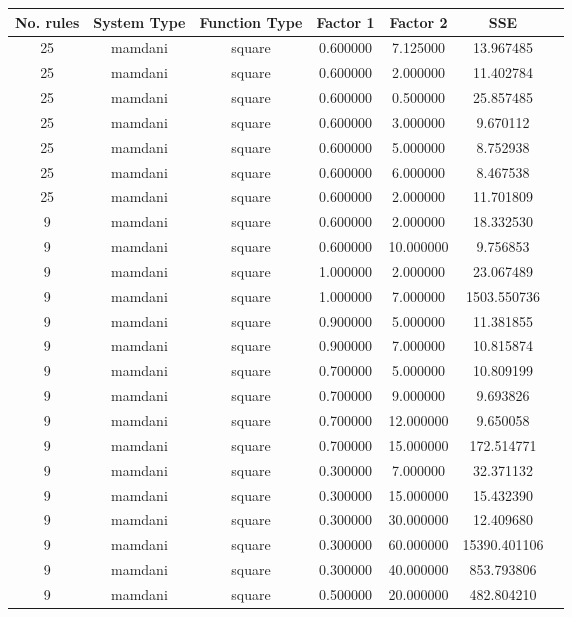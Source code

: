 \begin{tabular}{|c|c|c|c|c|c|c|}
\hline
No. rules & System Type & Function Type & Factor 1 & Factor 2 & SSE \\
\hline
25 & mamdani & square & 0.600000 & 7.125000 & 13.967485\\
\hline
25 & mamdani & square & 0.600000 & 2.000000 & 11.402784\\
\hline
25 & mamdani & square & 0.600000 & 0.500000 & 25.857485\\
\hline
25 & mamdani & square & 0.600000 & 3.000000 & 9.670112\\
\hline
25 & mamdani & square & 0.600000 & 5.000000 & 8.752938\\
\hline
25 & mamdani & square & 0.600000 & 6.000000 & 8.467538\\
\hline
25 & mamdani & square & 0.600000 & 2.000000 & 11.701809\\
\hline
9 & mamdani & square & 0.600000 & 2.000000 & 18.332530\\
\hline
9 & mamdani & square & 0.600000 & 10.000000 & 9.756853\\
\hline
9 & mamdani & square & 1.000000 & 2.000000 & 23.067489\\
\hline
9 & mamdani & square & 1.000000 & 7.000000 & 1503.550736\\
\hline
9 & mamdani & square & 0.900000 & 5.000000 & 11.381855\\
\hline
9 & mamdani & square & 0.900000 & 7.000000 & 10.815874\\
\hline
9 & mamdani & square & 0.700000 & 5.000000 & 10.809199\\
\hline
9 & mamdani & square & 0.700000 & 9.000000 & 9.693826\\
\hline
9 & mamdani & square & 0.700000 & 12.000000 & 9.650058\\
\hline
9 & mamdani & square & 0.700000 & 15.000000 & 172.514771\\
\hline
9 & mamdani & square & 0.300000 & 7.000000 & 32.371132\\
\hline
9 & mamdani & square & 0.300000 & 15.000000 & 15.432390\\
\hline
9 & mamdani & square & 0.300000 & 30.000000 & 12.409680\\
\hline
9 & mamdani & square & 0.300000 & 60.000000 & 15390.401106\\
\hline
9 & mamdani & square & 0.300000 & 40.000000 & 853.793806\\
\hline
9 & mamdani & square & 0.500000 & 20.000000 & 482.804210\\

\end{tabular}

